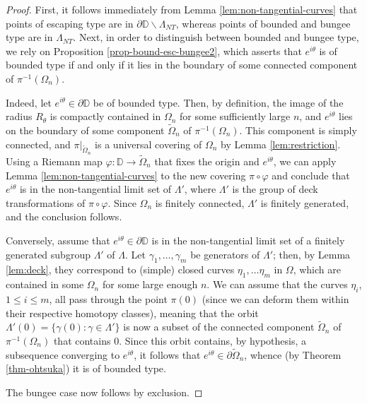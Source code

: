 \documentclass[11pt,a4paper,reqno]{amsart}
\theoremstyle{plain}
\theoremstyle{definition}
\theoremstyle{plain}
\def\DD{\mathbb{D}}
\renewcommand{\tilde}{\widetilde}
\begin{document}
\begin{proof}
First, it follows immediately from Lemma \ref{lem:non-tangential-curves} that points of escaping type are in $ \partial\mathbb{D}\smallsetminus\Lambda_{NT}$, whereas points of bounded and bungee type are in $ \Lambda_{NT} $. Next, in order to distinguish between bounded and bungee type, we rely on Proposition \ref{prop-bound-esc-bungee2}, which asserts that $ e^{i\theta}  $ is of bounded type if and only if it lies in the boundary of some connected component of $ \pi^{-1}(\Omega_n) $.

Indeed, let $e^{i\theta}\in\partial\DD$ be of bounded type. Then, by definition, the image of the radius $R_\theta$ is compactly contained in $\Omega_n$ for some sufficiently large $n$, and $e^{i\theta}$ lies on the boundary of some component $\tilde\Omega_n$ of $\pi^{-1}(\Omega_n)$. This component is simply connected, and $\pi|_{\tilde\Omega_n}$ is a universal covering of $\Omega_n$ by Lemma \ref{lem:restriction}. Using a Riemann map $\varphi\colon\DD\to\tilde\Omega_n$ that fixes the origin and $e^{i\theta}$, we can apply Lemma \ref{lem:non-tangential-curves} to the new covering $\pi\circ\varphi$ and conclude that $e^{i\theta}$ is in the non-tangential limit set of $\Lambda'$, where $\Lambda'$ is the group of deck transformations of $\pi\circ\varphi$. Since $\Omega_n$ is finitely connected, $\Lambda'$ is finitely generated, and the conclusion follows.
	
Conversely, assume that $e^{i\theta}\in\partial\DD$ is in the non-tangential limit set of a finitely generated subgroup $\Lambda'$ of $\Lambda$. Let $\gamma_1, \ldots, \gamma_m$ be generators of $\Lambda'$; then, by Lemma \ref{lem:deck}, they correspond to (simple) closed curves $\eta_1, \ldots \eta_m$ in $\Omega$, which are contained in some $\Omega_n$ for some large enough $n$. We can assume that the curves $\eta_i$, $1\leq i\leq m$, all pass through the point $\pi(0)$ (since we can deform them within their respective homotopy classes), meaning that the orbit $\Lambda'(0) = \{\gamma(0)\colon \gamma\in\Lambda'\}$ is now a subset of the connected component $\tilde\Omega_n$ of $\pi^{-1}(\Omega_n)$ that contains $0$. Since this orbit contains, by hypothesis, a subsequence converging to $e^{i\theta}$, it follows that $e^{i\theta}\in\partial\tilde\Omega_n$, whence (by Theorem \ref{thm-ohtsuka}) it is of bounded type.
	
The bungee case now follows by exclusion.
\end{proof}
\end{document}

